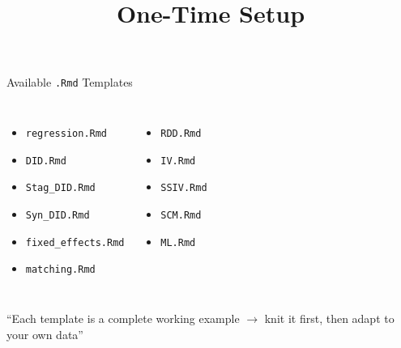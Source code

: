 \documentclass[dvipsnames,hyperref={pdfpagelabels=false}]{beamer}
\begin{document}
\begin{frame}{Available \texttt{.Rmd} Templates}
  \begin{columns}[t]
    \begin{itemize}
      \item \texttt{regression.Rmd}
      \item \texttt{DID.Rmd}
      \item \texttt{Stag\_DID.Rmd}
      \item \texttt{Syn\_DID.Rmd}
      \item \texttt{fixed\_effects.Rmd}
      \item \texttt{matching.Rmd}
    \end{itemize}

    \begin{itemize}
      \item \texttt{RDD.Rmd}
      \item \texttt{IV.Rmd}
      \item \texttt{SSIV.Rmd}
      \item \texttt{SCM.Rmd}
      \item \texttt{ML.Rmd}
    \end{itemize}
  \end{columns}

  \vspace{1em}
  \begin{center}
    \alert{``Each template is a complete working example $\to$ knit it first,
    then adapt to your own data''}
  \end{center}
\end{frame}

\title[]{One-Time Setup}
\author{}\institute{}\date{}
\begin{frame}{}
  \titlepage
\end{frame}
\end{document}
